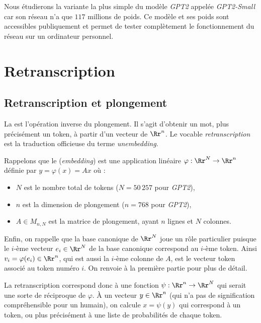 \documentclass[11pt,class=report,crop=false]{standalone}
\begin{document}
Nous étudierons la variante la plus simple du modèle \emph{GPT2} appelée \emph{GPT2-Small} car son réseau n'a \og{}que\fg{} $117$ millions de poids.
Ce modèle et ses poids sont accessibles publiquement et permet de tester complètement le fonctionnement du réseau sur un ordinateur personnel. 



\section{Retranscription}


\subsection{Retranscription et plongement}

La  est l'opération inverse du plongement. Il s'agit d'obtenir un mot, plus précisément un token, à partir d'un vecteur de $\Rr^n$.
Le vocable \emph{retranscription} est la traduction officieuse du terme \emph{unembedding}.

Rappelons que le  (\emph{embedding}) est une application linéaire 
$\varphi : \Rr^N \to \Rr^n$ définie par $y = \varphi(x) = Ax$
où :
\begin{itemize}
	\item $N$ est le nombre total de tokens ($N=50\,257$ pour \emph{GPT2}),
	\item $n$ est la dimension de plongement ($n=768$ pour \emph{GPT2}),
	\item $A \in M_{n,N}$ est la matrice de plongement, ayant $n$ lignes et $N$ colonnes.
\end{itemize}
Enfin, on rappelle que la base canonique de $\Rr^N$ joue un rôle particulier puisque le $i$-ème vecteur $e_i \in \Rr^N$ de la base canonique correspond au $i$-ème token. Ainsi $v_i = \varphi(e_i) \in \Rr^n$, qui est aussi la $i$-ème colonne de $A$, est le vecteur token associé au token numéro $i$. On renvoie à la première partie pour plus de détail.

La retranscription correspond donc à une fonction $\psi : \Rr^n \to \Rr^N$ qui serait une sorte de réciproque de $\varphi$. À un vecteur $y \in \Rr^n$ (qui n'a pas de signification compréhensible pour un humain), on calcule $x = \psi(y)$ qui correspond à un token, ou plus précisément à une liste de probabilités de chaque token.
\end{document}
